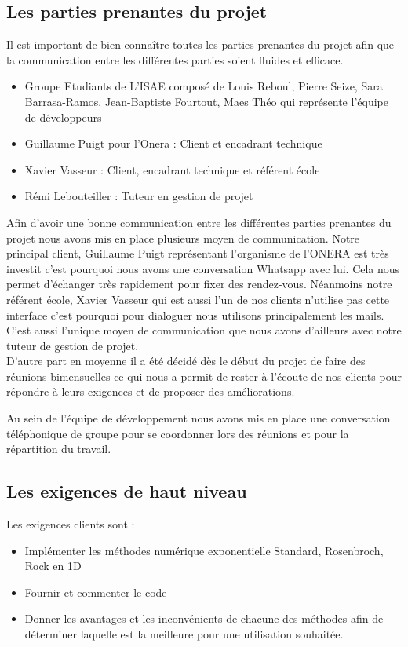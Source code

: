 \documentclass[a4paper,12pt]{report}
\theoremstyle{break}
\begin{document}
\subsection{Les parties prenantes du projet}	
   Il est important de bien connaître toutes les parties prenantes du projet afin que la communication entre les différentes parties soient fluides et efficace. 
   \begin{itemize}[label=\textbullet]
   	\item Groupe Etudiants de L’ISAE composé de Louis Reboul, Pierre Seize, Sara Barrasa-Ramos, Jean-Baptiste Fourtout, Maes Théo qui représente l’équipe de développeurs
   	\item Guillaume  Puigt pour l'Onera : Client et encadrant technique
   	\item Xavier Vasseur : Client, encadrant technique et référent école
   	\item Rémi Lebouteiller : Tuteur en gestion de projet
    \end{itemize}
\vspace{2mm}     
Afin d'avoir une bonne communication entre les différentes parties prenantes du projet nous avons mis en place plusieurs moyen de communication. Notre principal client, Guillaume Puigt représentant l'organisme de l'ONERA est très investit c'est pourquoi nous avons une conversation Whatsapp avec lui. Cela nous permet d'échanger très rapidement pour fixer des rendez-vous. Néanmoins notre référent école, Xavier Vasseur qui est aussi l’un de nos clients n’utilise pas cette interface c’est pourquoi pour dialoguer nous utilisons principalement les mails. C’est aussi l’unique moyen de communication que nous avons d’ailleurs avec notre tuteur de gestion de projet. \\

D’autre part en moyenne il a été décidé dès le début du projet de faire des réunions bimensuelles ce qui nous a permit de rester à l'écoute de nos clients pour répondre à leurs exigences et de proposer des améliorations.

Au sein de l'équipe de développement nous avons mis en place une conversation téléphonique de groupe pour se coordonner lors des réunions et pour la répartition du travail.


\subsection{Les exigences de haut niveau}
    Les exigences clients sont :
   \begin{itemize}[label=\textbullet]
   	\item Implémenter les méthodes numérique exponentielle Standard, Rosenbroch, Rock en 1D
   	\item Fournir et commenter le code
   	\item Donner les avantages et les inconvénients de chacune des méthodes afin de déterminer laquelle est la meilleure pour une utilisation souhaitée.
    \end{itemize}
\vspace{2mm}
\end{document}
